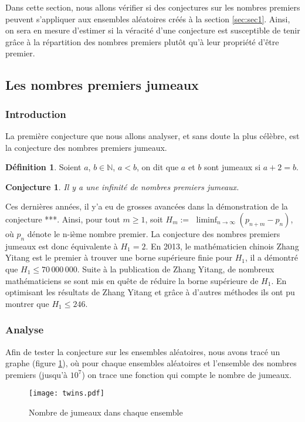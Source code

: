 \documentclass[../main.tex]{subfiles}
\begin{document}
\theoremstyle{definition}
\newtheorem{Def}{Définition}

\theoremstyle{plain}
\newtheorem{Conj}{Conjecture}

    \label{sec:test2}
    Dans cette section, nous allons vérifier si des conjectures sur les nombres premiers peuvent s'appliquer aux ensembles aléatoires créés à la section \ref{sec:sec1}. Ainsi, on sera en mesure d'estimer si la véracité d'une conjecture est susceptible de tenir grâce à la répartition des nombres premiers plutôt qu'à leur propriété d'être premier. 
 
 \subsection{Les nombres premiers jumeaux} 
 \subsubsection{Introduction}
 	La première conjecture que nous allons analyser, et sans doute la plus célèbre, est la conjecture des nombres premiers jumeaux.
	\begin{Def}
	Soient $a$, $b \in \mathbb{N} $, $ a < b$, on dit que $a$ et $b$ sont jumeaux si $ a + 2 = b $.
	\end{Def}  
	
	\begin{Conj}
	Il y a une infinité de nombres premiers jumeaux.
	\end{Conj}
	
	Ces dernières années, il y'a eu de grosses avancées dans la démonstration de la conjecture ***. Ainsi, pour tout $ m \geqslant 1$, soit $H_{m} := $ $\liminf_{n \rightarrow \infty}  (p_{n+m} - p_{n})$, où $p_{n}$ dénote le n-ième nombre premier. La conjecture des nombres premiers jumeaux est donc équivalente à $H_{1} = 2$. En 2013, le mathématicien chinois Zhang Yitang est le premier à trouver une borne supérieure finie pour $H_{1}$, il a démontré que $H_{1} \leqslant 70\, 000\, 000$. Suite à la publication de Zhang Yitang, de nombreux mathématiciens se sont mis en quête de réduire la borne supérieure de $H_{1}$. En optimisant les résultats de Zhang Yitang et grâce à d'autres méthodes ils ont pu montrer que $H_{1} \leqslant 246$.

\subsubsection{Analyse}
	Afin de tester la conjecture sur les ensembles aléatoires, nous avons tracé un graphe (figure \ref{im:image4}), où pour chaque ensembles aléatoires et l'ensemble des nombres premiers (jusqu'à $10^{7}$) on trace une fonction qui compte le nombre de jumeaux.
\begin{figure}[H]
 \centering
 \texttt{[image: twins.pdf]}
 \caption{Nombre de jumeaux dans chaque ensemble}
 \label{im:image4}
 \end{figure}
 
\end{document}

